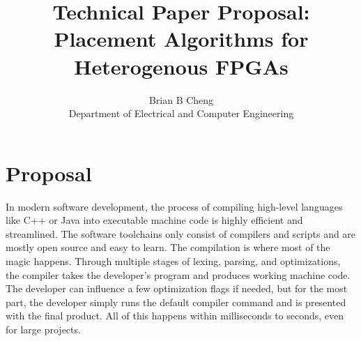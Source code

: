 \documentclass{article}
\begin{document}
\title{Technical Paper Proposal: \\ Placement Algorithms for Heterogenous FPGAs}
\author{Brian B Cheng \\ Department of Electrical and Computer Engineering}


\date{}
\maketitle

\section{Proposal}


In modern software development, the process of compiling high-level languages like C++ or Java into executable machine code is highly efficient and streamlined. 
The software toolchains only consist of compilers and scripts and are mostly open source and easy to learn. 
The compilation is where most of the magic happens.
Through multiple stages of lexing, parsing, and optimizations, the compiler takes the developer's program and produces working machine code.
The developer can influence a few optimization flags if needed, but for the most part, the developer simply runs the default compiler command and is presented with the final product.
All of this happens within milliseconds to seconds, even for large projects. 
\end{document}

